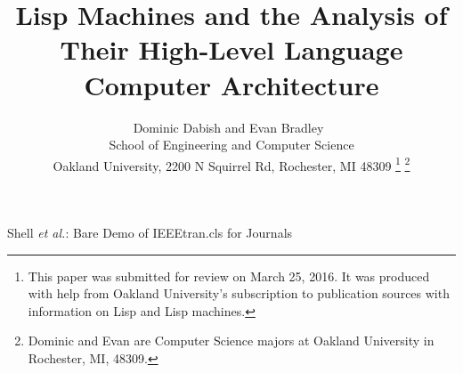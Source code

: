 \documentclass[journal]{IEEEtran}
\begin{document}
%
\title{Lisp Machines and the Analysis of Their High-Level Language Computer Architecture}
%
%
%

\author{
	\IEEEauthorblockN
		{
			Dominic Dabish and Evan Bradley\
		}
	\IEEEauthorblockN
		{
			\\School of Engineering and Computer Science
		}
	\IEEEauthorblockN
		{
			\\Oakland University, 2200 N Squirrel Rd, Rochester, MI 48309
		}
\thanks{
This paper was submitted for review on March 25, 2016. It was produced with help from Oakland University's subscription to publication sources with information on Lisp and Lisp machines.
}%
\thanks{
Dominic and Evan are Computer Science majors at Oakland University in Rochester, MI, 			48309. 
}%
}

% 
%



%
{Shell \MakeLowercase{\textit{et al.}}: Bare Demo of IEEEtran.cls for Journals}
% 
\end{document}
